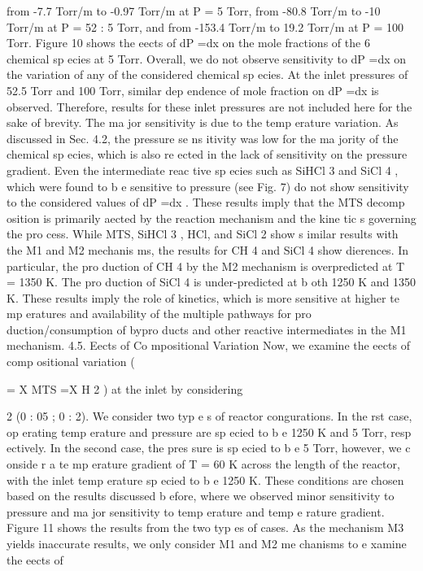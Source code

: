 \documentclass[10pt, letterpaper]{article}
\begin{document}
from -7.7 Torr/m to -0.97 Torr/m at
P
= 5 Torr, from -80.8 Torr/m to -10 Torr/m at
P
= 52
:
5 Torr, and
from -153.4 Torr/m to 19.2 Torr/m at
P
= 100 Torr.
Figure 10 shows the eects of
dP =dx
on the mole fractions of the 6 chemical sp ecies at 5 Torr. Overall, we
do not observe sensitivity to
dP =dx
on the variation of any of the considered chemical sp ecies. At the inlet
pressures of 52.5 Torr and 100 Torr, similar dep endence of mole fraction on
dP =dx
is observed. Therefore,
results for these inlet pressures are not included here for the sake of brevity. The ma jor sensitivity is due
to the temp erature variation. As discussed in Sec. 4.2, the pressure se ns itivity was low for the ma jority
of the chemical sp ecies, which is also re
ected in the lack of sensitivity on the pressure gradient. Even
the intermediate reac tive sp ecies such as SiHCl
3
and SiCl
4
, which were found to b e sensitive to pressure
(see Fig. 7) do not show sensitivity to the considered values of
dP =dx
. These results imply that the MTS
decomp osition is primarily aected by the reaction mechanism and the kine tic s governing the pro cess.
While MTS, SiHCl
3
, HCl, and SiCl
2
show s imilar results with the M1 and M2 mechanis ms, the results for
CH
4
and SiCl
4
show dierences. In particular, the pro duction of CH
4
by the M2 mechanism is overpredicted
at T = 1350 K. The pro duction of SiCl
4
is under-predicted at b oth 1250 K and 1350 K. These results imply
the role of kinetics, which is more sensitive at higher te mp eratures and availability of the multiple pathways
for pro duction/consumption of bypro ducts and other reactive intermediates in the M1 mechanism.
4.5. Eects of Co mpositional Variation
Now, we examine the eects of comp ositional variation (

=
X
MTS
=X
H
2
) at the inlet by considering

2
(0
:
05
;
0
:
2). We consider two typ e s of reactor congurations. In the rst case, op erating temp erature and
pressure are sp ecied to b e 1250 K and 5 Torr, resp ectively. In the second case, the pres sure is sp ecied to b e
5 Torr, however, we c onside r a te mp erature gradient of 
T
= 60 K across the length of the reactor, with the
inlet temp erature sp ecied to b e 1250 K. These conditions are chosen based on the results discussed b efore,
where we observed minor sensitivity to pressure and ma jor sensitivity to temp erature and temp e rature
gradient. Figure 11 shows the results from the two typ es of cases. As the mechanism M3 yields inaccurate
results, we only consider M1 and M2 me chanisms to e xamine the eects of
\end{document}
